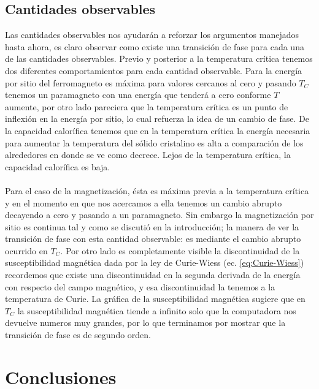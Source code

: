 \documentclass[11pt,a4paper]{article}
\begin{document}
\subsection{Cantidades observables}

Las cantidades observables nos ayudarán a reforzar los argumentos manejados hasta ahora, es claro observar como existe una transición de fase para cada una de las cantidades observables. Previo y posterior a la temperatura crítica tenemos dos diferentes comportamientos para cada cantidad observable. Para la energía por sitio del ferromagneto es máxima para valores cercanos al cero y pasando $T_C$ tenemos un paramagneto con una energía que tenderá a cero conforme $T$ aumente, por otro lado pareciera que la temperatura crítica es un punto de inflexión en la energía por sitio, lo cual refuerza la idea de un cambio de fase. De la capacidad calorífica tenemos que en la temperatura crítica la energía necesaria para aumentar la temperatura del sólido cristalino  es alta a comparación de los alrededores en donde se ve como decrece. Lejos de la temperatura crítica, la capacidad calorífica es baja.\\
\\
Para el caso de la magnetización, ésta es máxima previa a la temperatura crítica y en el momento en que nos acercamos a ella tenemos un cambio abrupto decayendo a cero y pasando a un paramagneto. Sin embargo la magnetización por sitio es continua tal y como se discutió en la introducción; la manera de ver la transición de fase con esta cantidad observable: es mediante el cambio abrupto ocurrido en $T_C$. Por otro lado es completamente visible la discontinuidad de la susceptibilidad magnética dada por la ley de Curie-Wiess (ec. \ref{eq:Curie-Wiess}) recordemos que existe una discontinuidad en la segunda derivada de la energía con respecto del campo magnético, y esa discontinuidad la tenemos a la temperatura de Curie. La gráfica de la susceptibilidad magnética sugiere que en $T_C$ la susceptibilidad magnética tiende a infinito solo que la computadora nos devuelve numeros muy grandes, por lo que terminamos por mostrar que la transición de fase es de segundo orden. 
\section{Conclusiones}
\end{document}

